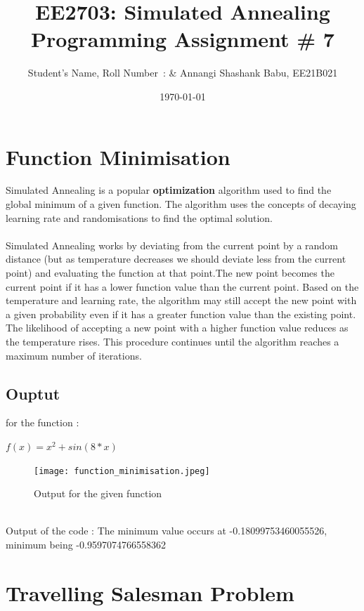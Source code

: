 \documentclass[titlepage, 11pt]{article}
\begin{document}
 
\title{
    {EE2703: Simulated Annealing} \\\
    {\vlarge Programming Assignment {\#} 7}\
}
\author{Student's Name, Roll Number\
    : & Annangi Shashank Babu, EE21B021}
\date{\today}     
\maketitle
\setcounter{page}{0}
\tableofcontents
\listoffigures
\listoftables
\newpage
\section{Function Minimisation}
Simulated Annealing is a popular \textbf{optimization} algorithm used to find the global minimum of a given function.
The algorithm uses the concepts of decaying learning rate and randomisations to 
find the optimal solution. 
\\
\\
Simulated Annealing works by deviating from the current point by a random distance (but as temperature decreases we should deviate less from the current point) 
and evaluating the function at that point.The new point becomes the current point if it has a lower function value than the current point. Based on the temperature and learning rate, the algorithm may still accept the new point with a given probability even if it has a greater function value than the existing point. The likelihood of accepting a new point with a higher function value reduces as the temperature rises. 
This procedure continues until the algorithm reaches a maximum number of iterations.

\subsection{Ouptut}
for the function : 
\begin{centre}
    $f(x)  =  x^2 + sin(8*x)$
\end{centre}
\begin{figure}[ht]
    \centering
    \texttt{[image: function\_minimisation.jpeg]}
    \caption{Output for the given function}
    \label{fig:function minimisation jpeg}
\end{figure}
\\
Output of the code : The minimum value occurs at -0.18099753460055526, minimum 
being -0.9597074766558362

\section{Travelling Salesman Problem}
\end{document}
